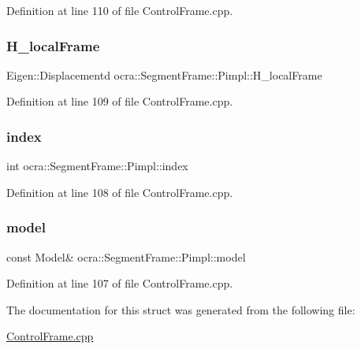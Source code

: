 Definition at line 110 of file Control\+Frame.\+cpp.

\hypertarget{structocra_1_1SegmentFrame_1_1Pimpl_a5e0d767dc540fbd56b1e6f125ba7abf6}{}\label{structocra_1_1SegmentFrame_1_1Pimpl_a5e0d767dc540fbd56b1e6f125ba7abf6} 
\subsubsection{\texorpdfstring{H\+\_\+local\+Frame}{H\_localFrame}}
{\footnotesize\ttfamily Eigen\+::\+Displacementd ocra\+::\+Segment\+Frame\+::\+Pimpl\+::\+H\+\_\+local\+Frame}



Definition at line 109 of file Control\+Frame.\+cpp.

\hypertarget{structocra_1_1SegmentFrame_1_1Pimpl_aeeadbd2b42d3e0cf750cbc0df50f213c}{}\label{structocra_1_1SegmentFrame_1_1Pimpl_aeeadbd2b42d3e0cf750cbc0df50f213c} 
\subsubsection{\texorpdfstring{index}{index}}
{\footnotesize\ttfamily int ocra\+::\+Segment\+Frame\+::\+Pimpl\+::index}



Definition at line 108 of file Control\+Frame.\+cpp.

\hypertarget{structocra_1_1SegmentFrame_1_1Pimpl_a787a1cc368ab12229ecd11358e2805e1}{}\label{structocra_1_1SegmentFrame_1_1Pimpl_a787a1cc368ab12229ecd11358e2805e1} 
\subsubsection{\texorpdfstring{model}{model}}
{\footnotesize\ttfamily const Model\& ocra\+::\+Segment\+Frame\+::\+Pimpl\+::model}



Definition at line 107 of file Control\+Frame.\+cpp.



The documentation for this struct was generated from the following file\+:\begin{DoxyCompactItemize}
\item 
\hyperlink{ControlFrame_8cpp}{Control\+Frame.\+cpp}\end{DoxyCompactItemize}
